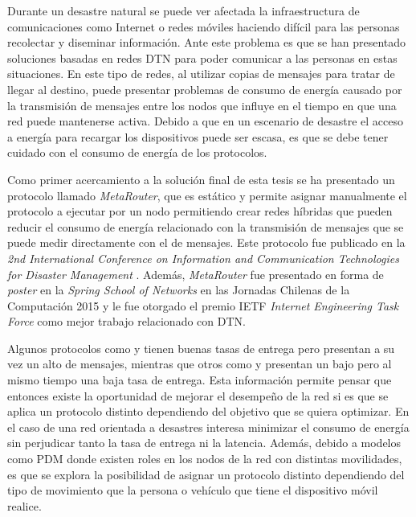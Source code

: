 Durante un desastre natural se puede ver afectada la infraestructura de
comunicaciones como Internet o redes móviles haciendo difícil para las personas
recolectar y diseminar información. Ante este problema es que se han presentado
soluciones basadas en redes DTN para poder comunicar a las personas en estas
situaciones. En este tipo de redes, al utilizar copias de mensajes para tratar
de llegar al destino, puede presentar problemas de consumo de energía causado
por la transmisión de mensajes entre los nodos que influye en el tiempo en que
una red puede mantenerse activa. Debido a que en un escenario de desastre el
acceso a energía para recargar los dispositivos puede ser escasa, es que se debe
tener cuidado con el consumo de energía de los protocolos.


Como primer acercamiento a la solución final de esta tesis se ha presentado un
protocolo llamado \textit{MetaRouter}, que es estático y permite asignar
manualmente el protocolo a ejecutar por un nodo permitiendo crear redes híbridas
que pueden reducir el consumo de energía relacionado con la transmisión de
mensajes que se puede medir directamente con el \overhead{} de mensajes. Este
protocolo fue publicado en la \textit{2nd International Conference on Information
and Communication Technologies for Disaster Management}
\cite{paper_evaluacion_nosotros}. Además, \textit{MetaRouter} fue presentado en
forma de \textit{poster} en la \textit{Spring School of Networks} en las
Jornadas Chilenas de la Computación 2015 y le fue otorgado el premio IETF
\textit{Internet Engineering Task Force} como mejor trabajo relacionado con DTN.


Algunos protocolos como \epidemic{} \cite{amin_vahdat_epidemic_2000} y
\maxprop{} \cite{burgess_maxprop:_2006} tienen buenas tasas de entrega pero
presentan a su vez un alto \overhead{} de mensajes, mientras que otros como
\syw{} \cite{spyropoulos_spray_2005} y \syf{} \cite{spyropoulos_spray_2007}
presentan un bajo \overhead{} pero al mismo tiempo una baja tasa de entrega.
Esta información permite pensar que entonces existe la oportunidad de mejorar el
desempeño de la red si es que se aplica un protocolo distinto dependiendo del
objetivo que se quiera optimizar. En el caso de una red orientada a desastres
interesa minimizar el consumo de energía sin perjudicar tanto la tasa de entrega
ni la latencia. Además, debido a modelos como PDM
\cite{uddin_post-disaster_2009} donde existen roles en los nodos de la red con
distintas movilidades, es que se explora la posibilidad de asignar un protocolo
distinto dependiendo del tipo de movimiento que la persona o vehículo que tiene
el dispositivo móvil realice.

